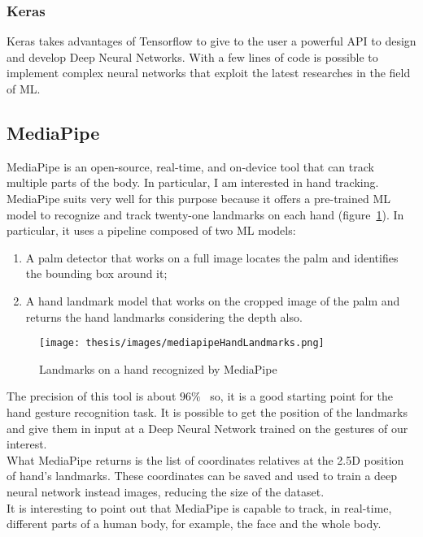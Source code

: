 \documentclass[../thesis.tex]{subfiles}
\begin{document}
\subsubsection{Keras}
Keras takes advantages of Tensorflow to give to the user a powerful API to design and develop Deep Neural Networks. With a few lines of code is possible to implement complex neural networks that exploit the latest researches in the field of \gls{ML}.

\subsection{MediaPipe}\label{sec:mediapipe}
MediaPipe is an open-source, real-time, and on-device tool that can track multiple parts of the body. In particular, I am interested in hand tracking. MediaPipe suits very well for this purpose because it offers a pre-trained \acrshort{ML} model to recognize and track twenty-one landmarks on each hand (figure~\ref{fig:landmarksMediapipe}). In particular, it uses a pipeline composed of two \acrshort{ML} models:
\begin{enumerate}
    \item A palm detector that works on a full image locates the palm and identifies the bounding box around it;
    \item A hand landmark model that works on the cropped image of the palm and returns the hand landmarks considering the depth also. 
\end{enumerate}
\begin{figure}[H]
    \centering
    \texttt{[image: thesis/images/mediapipeHandLandmarks.png]}
    \caption{Landmarks on a hand recognized by MediaPipe~\cite{site:mediapipe}}
    \label{fig:landmarksMediapipe}
\end{figure}
The precision of this tool is about $96\%$~\cite{paper:mediapipe} so, it is a good starting point for the hand gesture recognition task. It is possible to get the position of the landmarks and give them in input at a Deep Neural Network trained on the gestures of our interest.\\
What MediaPipe returns is the list of coordinates relatives at the 2.5D position of hand's landmarks. These coordinates can be saved and used to train a deep neural network instead images, reducing the size of the dataset.\\
It is interesting to point out that MediaPipe is capable to track, in real-time, different parts of a human body, for example, the face and the whole body.~\cite{site:mediapipe}
\end{document}
